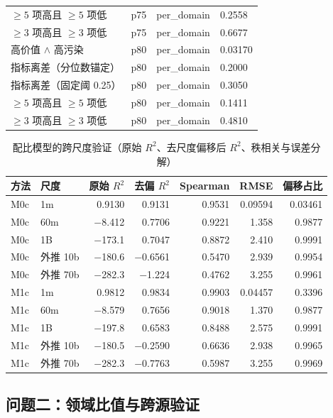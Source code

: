 \begin{table}[htbp]
\begin{tabular}{@{}llll@{}}
    $\ge 5$ 项高且 $\ge 5$ 项低 & p75 & per\_domain & 0.2558 \\
    $\ge 3$ 项高且 $\ge 3$ 项低 & p75 & per\_domain & 0.6677 \\
    高价值 $\wedge$ 高污染 & p80 & per\_domain & 0.03170 \\
    指标离差（分位数锚定） & p80 & per\_domain & 0.2000 \\
    指标离差（固定阈 0.25） & p80 & per\_domain & 0.3050 \\
    $\ge 5$ 项高且 $\ge 5$ 项低 & p80 & per\_domain & 0.1411 \\
    $\ge 3$ 项高且 $\ge 3$ 项低 & p80 & per\_domain & 0.4810 \\
    \bottomrule
  \end{tabular}
\end{table}

\begin{table}[htbp]
  \centering
  \caption{配比模型的跨尺度验证（原始 $R^2$、去尺度偏移后 $R^2$、秩相关与误差分解）}
  \label{tab:app-q1-scale}
  \small
  \begin{tabular}{@{}llrrrrr@{}}
    \toprule
    方法 & 尺度 & 原始 $R^2$ & 去偏 $R^2$ & Spearman & RMSE & 偏移占比 \\
    \midrule
    M0c & 1m & 0.9130 & 0.9131 & 0.9531 & 0.09594 & 0.03461 \\
    M0c & 60m & $-$8.412 & 0.7706 & 0.9221 & 1.358 & 0.9877 \\
    M0c & 1B & $-$173.1 & 0.7047 & 0.8872 & 2.410 & 0.9991 \\
    M0c & 外推 10b & $-$180.6 & $-$0.6561 & 0.5470 & 2.939 & 0.9954 \\
    M0c & 外推 70b & $-$282.3 & $-$1.224 & 0.4762 & 3.255 & 0.9961 \\
    M1c & 1m & 0.9812 & 0.9834 & 0.9903 & 0.04457 & 0.3396 \\
    M1c & 60m & $-$8.579 & 0.7656 & 0.9018 & 1.370 & 0.9877 \\
    M1c & 1B & $-$197.8 & 0.6583 & 0.8488 & 2.575 & 0.9991 \\
    M1c & 外推 10b & $-$180.5 & $-$0.2590 & 0.6636 & 2.938 & 0.9965 \\
    M1c & 外推 70b & $-$282.3 & $-$0.7763 & 0.5987 & 3.255 & 0.9969 \\
    \bottomrule
  \end{tabular}
\end{table}

\clearpage
\subsection{问题二：领域比值与跨源验证}

